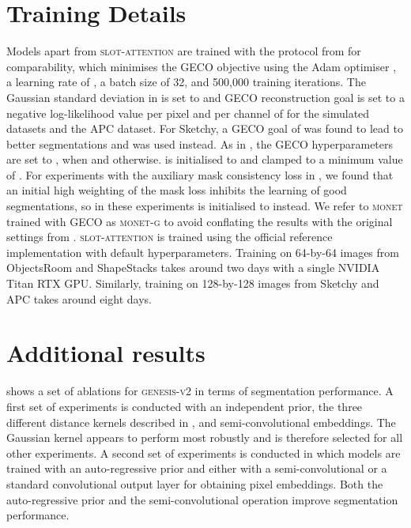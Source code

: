 \documentclass{article}
\begin{document}
\section{Training Details}
\label{app:training}

Models apart from \textsc{slot-attention} are trained with the protocol from \citet{engelcke2020genesis} for comparability, which minimises the GECO objective \cite{rezende2018taming} using the Adam optimiser \citep{kingma2014adam}, a learning rate of , a batch size of 32, and 500,000 training iterations.
The Gaussian standard deviation  in  is set to  and GECO reconstruction goal is set to a negative log-likelihood value per pixel and per channel of  for the simulated datasets and the APC dataset.
For Sketchy, a GECO goal of  was found to lead to better segmentations and was used instead.
As in \citet{engelcke2020genesis}, the GECO hyperparameters are set to ,  when  and  otherwise.
 is initialised to  and clamped to a minimum value of .
For experiments with the auxiliary mask consistency loss in , we found that an initial high weighting of the mask loss inhibits the learning of good segmentations, so in these experiments  is initialised to  instead.
We refer to \textsc{monet} trained with GECO as \textsc{monet-g} to avoid conflating the results with the original settings from \citet{burgess2019monet}.
\textsc{slot-attention} is trained using the official reference implementation with default hyperparameters.
Training on 64-by-64 images from ObjectsRoom and ShapeStacks takes around two days with a single NVIDIA Titan RTX GPU.
Similarly, training on 128-by-128 images from Sketchy and APC takes around eight days.


\section{Additional results}
\label{app:additional_results}

 shows a set of ablations for \textsc{genesis-v2} in terms of segmentation performance.
A first set of experiments is conducted with an independent prior, the three different distance kernels described in , and semi-convolutional embeddings.
The Gaussian kernel appears to perform most robustly and is therefore selected for all other experiments.
A second set of experiments is conducted in which models are trained with an auto-regressive prior and either with a semi-convolutional or a standard convolutional output layer for obtaining pixel embeddings.
Both the auto-regressive prior and the semi-convolutional operation improve segmentation performance.
\end{document}
